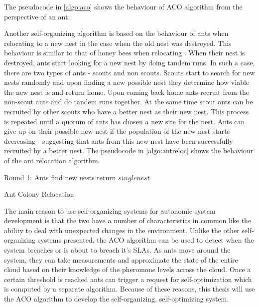 {The pseudocode in \ref{algo:aco} shows the behaviour of ACO algorithm from the perspective of an ant.

\begin{algorithm}
return $best{solution) based on pheromones$
\caption{Ant Colony Optimization}\label{algo:aco}
\end{algorithm}

Another self-organizing algorithm is based on the behaviour of ants when relocating to a new nest in the case when the old nest was destroyed. This behaviour is similar to that of honey bees when relocating \cite{consensus decision making in the ant ...}. When their nest is destroyed, ants start looking for a new nest by doing tandem runs. In such a case, there are two types of ants - scouts and non scouts. Scouts start to search for new nests randomly and upon finding a new possible nest they determine how viable the new nest is and return home. Upon coming back home ants recruit from the non-scout ants and do tandem runs together. At the same time scout ants can be recruited by other scouts who have a better nest as their new nest. This process is repeated until a quorum of ants has chosen a new site for the nest. Ants can give up on their possible new nest if the population of the new nest starts decreasing - suggesting that ants from this new nest have been successfully recruited by a better nest. The pseudocode in \ref{algo:antreloc} shows the behaviour of the ant relocation algorithm.

\begin{algorithm}
Round 1: Ants find new nests
return $single nest$
\caption{Ant Colony Relocation}\label{algo:antreloc}
\end{algorithm}

The main reason to use self-organizing systems for autonomic system development is that the two have a number of characteristics in common like the ability to deal with unexpected changes in the environment. Unlike the other self-organizing systems presented, the ACO algorithm can be used to detect when the system breaches or is about to breach it's SLAs. As ants move around the system, they can take measurements and approximate the state of the entire cloud based on their knowledge of the pheromone levels across the cloud. Once a certain threshold is reached ants can trigger a request for self-optimization which is computed by a separate algorithm. Because of these reasons, this thesis will use the ACO algorithm to develop the self-organizing, self-optimizing system.

}
